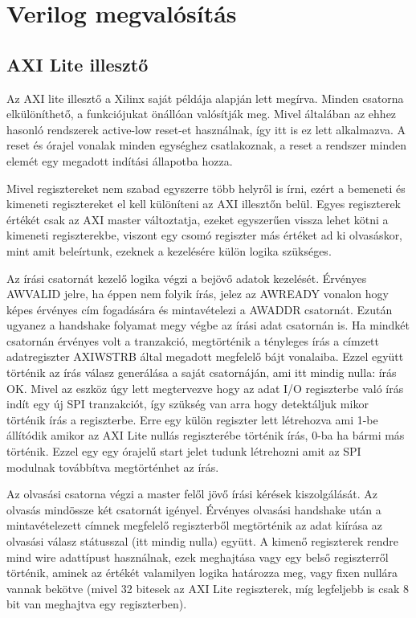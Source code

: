 \documentclass[a4paper,11pt]{article}
\begin{document}
\section{Verilog megvalósítás}

\subsection{AXI Lite illesztő}
Az AXI lite illesztő a Xilinx saját példája alapján lett megírva. Minden csatorna elkülöníthető, a funkciójukat önállóan valósítják meg. Mivel általában az ehhez hasonló rendszerek active-low reset-et használnak, így itt is ez lett alkalmazva. A reset és órajel vonalak minden egységhez csatlakoznak, a reset a rendszer minden elemét egy megadott indítási állapotba hozza.

Mivel regisztereket nem szabad egyszerre több helyről is írni, ezért a bemeneti és kimeneti regisztereket el kell különíteni az AXI illesztőn belül. Egyes regiszterek értékét csak az AXI master változtatja, ezeket egyszerűen vissza lehet kötni a kimeneti regiszterekbe, viszont egy csomó regiszter más értéket ad ki olvasáskor, mint amit beleírtunk, ezeknek a kezelésére külön logika szükséges.

Az írási csatornát kezelő logika végzi a bejövő adatok kezelését. Érvényes AWVALID jelre, ha éppen nem folyik írás, jelez az AWREADY vonalon hogy képes érvényes cím fogadására és mintavételezi a AWADDR csatornát. Ezután ugyanez a handshake folyamat megy végbe az írási adat csatornán is. Ha mindkét csatornán érvényes volt a tranzakció, megtörténik a tényleges írás a címzett adatregiszter AXI\textunderscore WSTRB által megadott megfelelő bájt vonalaiba. Ezzel együtt történik az írás válasz generálása a saját csatornáján, ami itt mindig nulla: írás OK. Mivel az eszköz úgy lett megtervezve hogy az adat I/O regiszterbe való írás indít egy új SPI tranzakciót, így szükség van arra hogy detektáljuk mikor történik írás a regiszterbe. Erre egy külön regiszter lett létrehozva ami 1-be állítódik amikor az AXI Lite nullás regiszterébe történik írás, 0-ba ha bármi más történik. Ezzel egy egy órajelű start jelet tudunk létrehozni amit az SPI modulnak továbbítva megtörténhet az írás.

Az olvasási csatorna végzi a master felől jövő írási kérések kiszolgálását. Az olvasás mindössze két csatornát igényel. Érvényes olvasási handshake után a mintavételezett címnek megfelelő regiszterből megtörténik az adat kiírása az olvasási válasz státusszal (itt mindig nulla) együtt. A kimenő regiszterek rendre mind wire adattípust használnak, ezek meghajtása vagy egy belső regiszterről történik, aminek az értékét valamilyen logika határozza meg, vagy fixen nullára vannak bekötve (mivel 32 bitesek az AXI Lite regiszterek, míg legfeljebb is csak 8 bit van meghajtva egy regiszterben).
\end{document}
